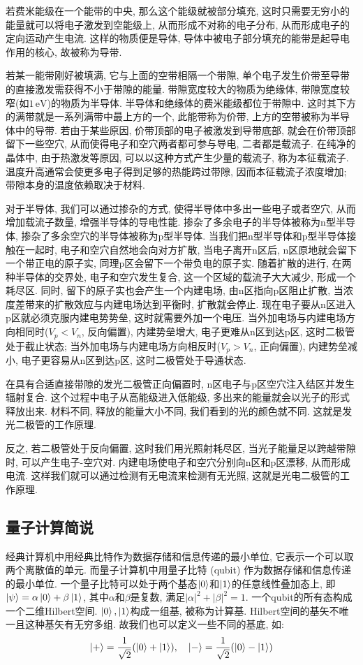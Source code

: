 若费米能级在一个能带的中央, 那么这个能级就被部分填充, 这时只需要无穷小的能量就可以将电子激发到空能级上, 从而形成不对称的电子分布, 从而形成电子的定向运动产生电流. 这样的物质便是导体, 导体中被电子部分填充的能带是起导电作用的核心, 故被称为导带.

若某一能带刚好被填满, 它与上面的空带相隔一个带隙, 单个电子发生价带至导带的直接激发需获得不小于带隙的能量. 带隙宽度较大的物质为绝缘体, 带隙宽度较窄(如$1\,\mathrm{eV}$)的物质为半导体. 半导体和绝缘体的费米能级都位于带隙中. 这时其下方的满带就是一系列满带中最上方的一个, 此能带称为价带, 上方的空带被称为半导体中的导带. 若由于某些原因, 价带顶部的电子被激发到导带底部, 就会在价带顶部留下一些空穴, 从而使得电子和空穴两者都可参与导电, 二者都是载流子. 在纯净的晶体中, 由于热激发等原因, 可以以这种方式产生少量的载流子, 称为本征载流子. 温度升高通常会使更多电子得到足够的热能跨过带隙, 因而本征载流子浓度增加; 带隙本身的温度依赖取决于材料.

对于半导体, 我们可以通过掺杂的方式, 使得半导体中多出一些电子或者空穴, 从而增加载流子数量, 增强半导体的导电性能. 掺杂了多余电子的半导体被称为n型半导体, 掺杂了多余空穴的半导体被称为p型半导体.
当我们把n型半导体和p型半导体接触在一起时, 电子和空穴自然地会向对方扩散, 当电子离开n区后, n区原地就会留下一个带正电的原子实, 同理p区会留下一个带负电的原子实. 随着扩散的进行, 在两种半导体的交界处, 电子和空穴发生复合, 这一个区域的载流子大大减少, 形成一个耗尽区. 同时, 留下的原子实也会产生一个内建电场, 由n区指向p区阻止扩散, 当浓度差带来的扩散效应与内建电场达到平衡时, 扩散就会停止. 现在电子要从n区进入p区就必须克服内建电势势垒, 这时就需要外加一个电压. 当外加电场与内建电场方向相同时($V_p<V_n$, 反向偏置), 内建势垒增大, 电子更难从n区到达p区, 这时二极管处于截止状态; 当外加电场与内建电场方向相反时($V_p>V_n$, 正向偏置), 内建势垒减小, 电子更容易从n区到达p区, 这时二极管处于导通状态.

在具有合适直接带隙的发光二极管正向偏置时, n区电子与p区空穴注入结区并发生辐射复合. 这个过程中电子从高能级进入低能级, 多出来的能量就会以光子的形式释放出来. 材料不同, 释放的能量大小不同, 我们看到的光的颜色就不同. 这就是发光二极管的工作原理.

反之, 若二极管处于反向偏置, 这时我们用光照射耗尽区, 当光子能量足以跨越带隙时, 可以产生电子-空穴对. 内建电场使电子和空穴分别向n区和p区漂移, 从而形成电流. 这样我们就可以通过检测有无电流来检测有无光照, 这就是光电二极管的工作原理.

\subsection{量子计算简说}
经典计算机中用经典比特作为数据存储和信息传递的最小单位, 它表示一个可以取两个离散值的单元. 而量子计算机中用量子比特 (qubit) 作为数据存储和信息传递的最小单位. 一个量子比特可以处于两个基态$\ket{0}$和$\ket{1}$的任意线性叠加态上, 即$\ket{\psi} = \alpha\ket{0} + \beta\ket{1}$, 其中$\alpha$和$\beta$是复数, 满足$|\alpha|^2 + |\beta|^2 = 1$. 一个qubit的所有态构成一个二维Hilbert空间. {$\ket{0},\ket{1}$}构成一组基, 被称为计算基. Hilbert空间的基矢不唯一且这种基矢有无穷多组. 故我们也可以定义一些不同的基底, 如:
\[
\ket{+} = \frac{1}{\sqrt{2}}(\ket{0} + \ket{1}), \quad \ket{-} = \frac{1}{\sqrt{2}}(\ket{0} - \ket{1})
\]

